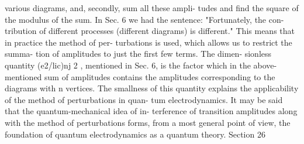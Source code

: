 \documentclass[a4paper,sfsidenotes,colorlinks=true]{tufte-book}
\numberwithin{equation}{section}
\numberwithin{figure}{section}
\begin{document}
{{{{{{various diagrams, and, secondly, sum all these ampli- tudes and find the square of the modulus of the sum.
In Sec. 6 we had the sentence: "Fortunately, the con- tribution of different processes (different diagrams) is different." This means that in practice the method of per- turbations is used, which allows us to restrict the summa- tion of amplitudes to just the first few terms. The dimen- sionless quantity (e2/lic)nj 2 , mentioned in Sec. 6, is the factor which in the above-mentioned sum of amplitudes contains the amplitudes corresponding to the diagrams with n vertices. The smallness of this quantity explains the applicability of the method of perturbations in quan-
tum electrodynamics. It may be said that the quantum-mechanical idea of in- terference of transition amplitudes along with the method of perturbations forms, from a most general point of view, the foundation of quantum electrodynamics as a quantum theory.
Section 26	
}}}}}}
\end{document}
